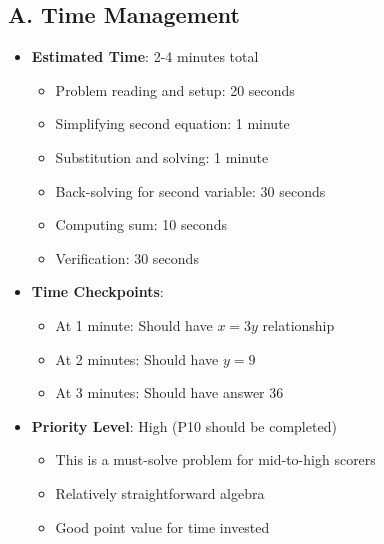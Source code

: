 \documentclass[12pt]{article}
\begin{document}
\begin{competitionbox}
\subsection*{A. Time Management}
\begin{itemize}[leftmargin=*]
    \item \textbf{Estimated Time}: 2-4 minutes total
    \begin{itemize}
        \item Problem reading and setup: 20 seconds
        \item Simplifying second equation: 1 minute
        \item Substitution and solving: 1 minute
        \item Back-solving for second variable: 30 seconds
        \item Computing sum: 10 seconds
        \item Verification: 30 seconds
    \end{itemize}
    \item \textbf{Time Checkpoints}: 
    \begin{itemize}
        \item At 1 minute: Should have $x = 3y$ relationship
        \item At 2 minutes: Should have $y = 9$
        \item At 3 minutes: Should have answer 36
    \end{itemize}
    \item \textbf{Priority Level}: High (P10 should be completed)
    \begin{itemize}
        \item This is a must-solve problem for mid-to-high scorers
        \item Relatively straightforward algebra
        \item Good point value for time invested
    \end{itemize}
\end{itemize}


\end{competitionbox}
\end{document}
